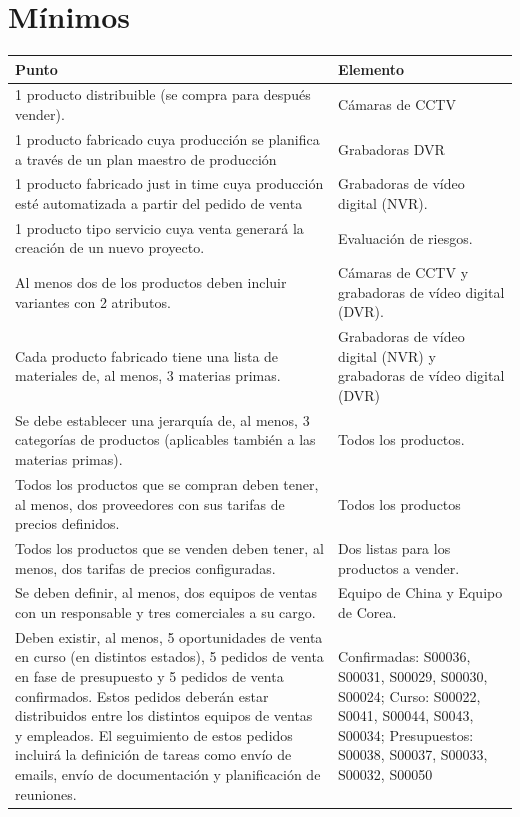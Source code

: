 \documentclass{report}
\begin{document}
      \section*{Mínimos}
        \begin{longtable}{|p{7cm}|p{7cm}|}
          \hline
          \textbf{Punto} & \textbf{Elemento}\\
          \hline
          \hline
          1 producto distribuible (se compra para después vender). & Cámaras de CCTV  \\
          \hline
          1 producto fabricado cuya producción se planifica a través de un plan maestro de producción & Grabadoras DVR  \\
          \hline
          1 producto fabricado just in time cuya producción esté automatizada a partir del pedido de venta & Grabadoras de vídeo digital (NVR).\\
          \hline
          1 producto tipo servicio cuya venta generará la creación de un nuevo proyecto. & Evaluación de riesgos.\\
          \hline
          Al menos dos de los productos deben incluir variantes con 2 atributos. & Cámaras de CCTV y grabadoras de vídeo digital (DVR). \\
          \hline
          Cada producto fabricado tiene una lista de materiales de, al menos, 3 materias primas. & Grabadoras de vídeo digital (NVR) y grabadoras de vídeo digital (DVR)  \\
          \hline
          Se debe establecer una jerarquía de, al menos, 3 categorías de productos (aplicables también a las materias primas). & Todos los productos. \\
          \hline
          Todos los productos que se compran deben tener, al menos, dos proveedores con sus tarifas de precios definidos. &  Todos los productos\\
          \hline
          Todos los productos que se venden deben tener, al menos, dos tarifas de precios configuradas. & Dos listas para los productos a vender. \\
          \hline
          Se deben definir, al menos, dos equipos de ventas con un responsable y tres comerciales a su cargo. & Equipo de China y Equipo de Corea. \\
          \hline
          Deben existir, al menos, 5 oportunidades de venta en curso (en distintos estados), 5 pedidos de venta en fase de presupuesto y 5 pedidos de venta confirmados. Estos pedidos deberán estar distribuidos entre los distintos equipos de ventas y empleados. El seguimiento de estos pedidos incluirá la definición de tareas como envío de emails, envío de documentación y planificación de reuniones. & Confirmadas: S00036, S00031, S00029, S00030, S00024; Curso: S00022, S0041, S00044, S0043, S00034; Presupuestos: S00038, S00037, S00033, S00032, S00050\\

\end{longtable}
\end{document}
